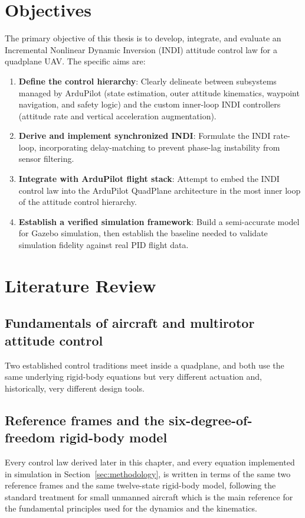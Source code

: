 \documentclass{article}
\begin{document}
\section{Objectives}
\label{sec:aims}
The primary objective of this thesis is to develop, integrate, and evaluate an Incremental Nonlinear Dynamic Inversion (INDI) attitude control law for a quadplane UAV. The specific aims are:
\begin{enumerate}
    \item \textbf{Define the control hierarchy}: Clearly delineate between subsystems managed by ArduPilot (state estimation, outer attitude kinematics, waypoint navigation, and safety logic) and the custom inner-loop INDI controllers (attitude rate and vertical acceleration augmentation).
    \item \textbf{Derive and implement synchronized INDI}: Formulate the INDI rate-loop, incorporating delay-matching to prevent phase-lag instability from sensor filtering.
    \item \textbf{Integrate with ArduPilot flight stack}: Attempt to embed the INDI control law into the ArduPilot QuadPlane architecture in the most inner loop of the attitude control hierarchy.
    \item \textbf{Establish a verified simulation framework}: Build a semi-accurate model for Gazebo simulation, then establish the baseline needed to validate simulation fidelity against real PID flight data.
\end{enumerate}


\section{Literature Review}
\label{sec:litreview}

\subsection{Fundamentals of aircraft and multirotor attitude control}
\label{sec:fundamentals}

Two established control traditions meet inside a quadplane, and both use the same underlying rigid-body equations but very
different actuation and, historically, very different design tools.

\subsection{Reference frames and the six-degree-of-freedom rigid-body model}
\label{sec:sixdof}
Every control law derived later in this chapter, and every equation implemented in simulation in Section~\ref{sec:methodology}, is written in terms of the same two reference frames and the same twelve-state rigid-body model, following the standard treatment for small unmanned aircraft \citep{beardmclain2012} which is the main reference for the fundamental principles used for the dynamics and the kinematics. 
\end{document}
